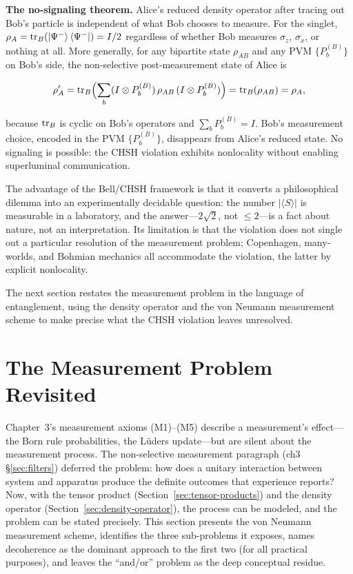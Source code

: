 \medskip\noindent\textbf{The no-signaling theorem.}
Alice's reduced density operator after tracing out Bob's particle is independent of what Bob chooses to measure. For the singlet, $\rho_A = \mathrm{tr}_B(\ket{\Psi^-}\bra{\Psi^-}) = I/2$ regardless of whether Bob measures $\sigma_z$, $\sigma_x$, or nothing at all. More generally, for any bipartite state $\rho_{AB}$ and any PVM $\{P_b^{(B)}\}$ on Bob's side, the non-selective post-measurement state of Alice is
\begin{linenomath}
\begin{equation}
\rho_A'
= \mathrm{tr}_B\Bigl(\sum_b (I \otimes P_b^{(B)}) \,\rho_{AB}\, (I \otimes P_b^{(B)})\Bigr)
= \mathrm{tr}_B(\rho_{AB}) = \rho_A,
\end{equation}
\end{linenomath}
because $\mathrm{tr}_B$ is cyclic on Bob's operators and $\sum_b P_b^{(B)} = I$. Bob's measurement choice, encoded in the PVM $\{P_b^{(B)}\}$, disappears from Alice's reduced state. No signaling is possible: the CHSH violation exhibits nonlocality without enabling superluminal communication.

The advantage of the Bell/CHSH framework is that it converts a philosophical dilemma into an experimentally decidable question: the number $\lvert\langle S\rangle\rvert$ is measurable in a laboratory, and the answer---$2\sqrt{2}$, not $\le2$---is a fact about nature, not an interpretation. Its limitation is that the violation does not single out a particular resolution of the measurement problem; Copenhagen, many-worlds, and Bohmian mechanics all accommodate the violation, the latter by explicit nonlocality.

The next section restates the measurement problem in the language of entanglement, using the density operator and the von Neumann measurement scheme to make precise what the CHSH violation leaves unresolved.
\section{The Measurement Problem Revisited}
\label{sec:measurement-problem}

Chapter~3's measurement axioms (M1)--(M5) describe a measurement's effect---the Born rule probabilities, the L\"uders update---but are silent about the measurement process. The non-selective measurement paragraph (ch3 \S\ref{sec:filters}) deferred the problem: how does a unitary interaction between system and apparatus produce the definite outcomes that experience reports? Now, with the tensor product (Section~\ref{sec:tensor-products}) and the density operator (Section~\ref{sec:density-operator}), the process can be modeled, and the problem can be stated precisely. This section presents the von Neumann measurement scheme, identifies the three sub-problems it exposes, names decoherence as the dominant approach to the first two (for all practical purposes), and leaves the ``and/or'' problem as the deep conceptual residue.

